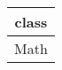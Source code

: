 \begin{tabular}{|c|}
    \hline
        \textbf{class} \\ \hline
        Math \\ \hline
\end{tabular}
